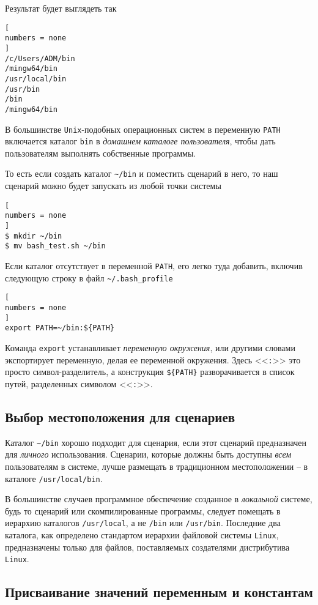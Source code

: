 \documentclass[%
	11pt,
	a4paper,
	utf8,
		]{article}
\begin{document}
Результат будет выглядеть так
\begin{lstlisting}[
numbers = none
]
/c/Users/ADM/bin
/mingw64/bin
/usr/local/bin
/usr/bin
/bin
/mingw64/bin
\end{lstlisting}

В большинстве \texttt{Unix}-подобных операционных систем в переменную \texttt{PATH} включается каталог \verb|bin| в \emph{домашнем каталоге пользователя}, чтобы дать пользователям выполнять собственные программы.

То есть если создать каталог \verb|~/bin| и поместить сценарий в него, то наш сценарий можно будет запускать из любой точки системы
\begin{lstlisting}[
numbers = none
]
$ mkdir ~/bin
$ mv bash_test.sh ~/bin
\end{lstlisting}

Если каталог отсутствует в переменной \verb|PATH|, его легко туда добавить, включив следующую строку в файл \verb|~/.bash_profile|
\begin{lstlisting}[
numbers = none
]
export PATH=~/bin:${PATH}
\end{lstlisting}

Команда \texttt{export} устанавливает \emph{переменную окружения}, или другими словами экспортирует переменную, делая ее {переменной окружения}. Здесь <<\texttt{:}>> это просто символ-разделитель, а конструкция \verb|${PATH}| разворачивается в список путей, разделенных символом <<\texttt{:}>>.

\subsection{Выбор местоположения для сценариев}

Каталог \verb|~/bin| хорошо подходит для сценария, если этот сценарий предназначен для \emph{личного} использования. Сценарии, которые должны быть доступны \emph{всем} пользователям в системе, лучше размещать в традиционном местоположении -- в каталоге \verb|/usr/local/bin|.

В большинстве случаев программное обеспечение созданное в \emph{локальной} системе, будь то сценарий или скомпилированные программы, следует помещать в иерархию каталогов \verb|/usr/local|, а не \verb|/bin| или \verb|/usr/bin|. Последние два каталога, как определено стандартом иерархии файловой системы \texttt{Linux}, предназначены только для файлов, поставляемых создателями дистрибутива \texttt{Linux}.

\subsection{Присваивание значений переменным и константам}
\end{document}
